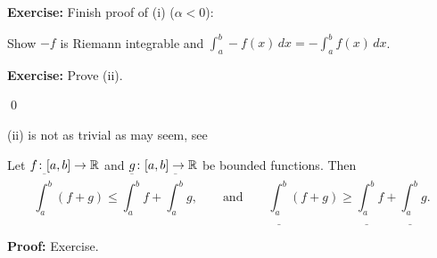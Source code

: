 \documentclass[10pt,aspectratio=149]{beamer}
\begin{document}
\begin{frame}

\textbf{Exercise:} Finish proof of (i) ($\alpha < 0$):

\pause
Show $-f$ is Riemann integrable and
$\int_a^b - f(x)\,dx =
-
\int_a^b f(x)\,dx$.

\pause
\medskip

\textbf{Exercise:} Prove (ii).

\medskip
\qed

\pause
\medskip

(ii) is not as trivial as may seem,
\pause
see

\begin{proposition}
Let $f \colon [a,b] \to {\mathbb{R}}$ and $g \colon [a,b] \to {\mathbb{R}}$ be bounded
functions.  Then
\begin{equation*}
\overline{\int_a^b} (f+g) \leq \overline{\int_a^b}f+\overline{\int_a^b}g
,
\qquad
\text{and}
\qquad
\underline{\int_a^b} (f+g) \geq \underline{\int_a^b}f+\underline{\int_a^b}g
.
\end{equation*}
\end{proposition}

\pause
\textbf{Proof:} Exercise.

\end{frame}
\end{document}
